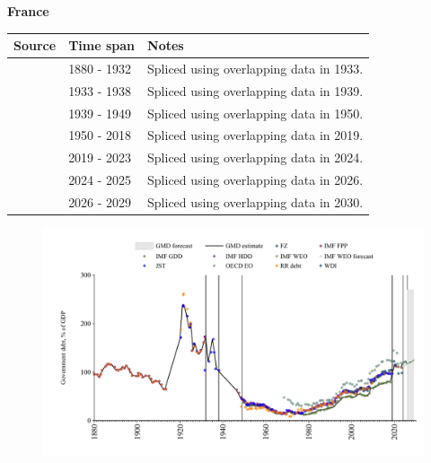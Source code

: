 \documentclass[12pt,a4paper,landscape]{article}
\begin{document}
\begin{adjustbox}{max totalsize={\paperwidth}{\paperheight},center}
\begin{minipage}[t][\textheight][t]{\textwidth}
\vspace*{0.5cm}
{}
\begin{center}
{\Large\bfseries France}
\end{center}
\vspace{0.5cm}
\begin{table}[H]
\centering
\small
\begin{tabular}{|l|l|l|}
\hline
\textbf{Source} & \textbf{Time span} & \textbf{Notes} \\
\hline
\rowcolor{white}\cite{IMF_FPP}& 1880 - 1932 &Spliced using overlapping data in 1933.\\
\rowcolor{lightgray}\cite{JST}& 1933 - 1938 &Spliced using overlapping data in 1939.\\
\rowcolor{white}\cite{IMF_FPP}& 1939 - 1949 &Spliced using overlapping data in 1950.\\
\rowcolor{lightgray}\cite{IMF_GDD}& 1950 - 2018 &Spliced using overlapping data in 2019.\\
\rowcolor{white}\cite{IMF_FPP}& 2019 - 2023 &Spliced using overlapping data in 2024.\\
\rowcolor{lightgray}\cite{OECD_EO}& 2024 - 2025 &Spliced using overlapping data in 2026.\\
\rowcolor{white}\cite{IMF_WEO_forecast}& 2026 - 2029 &Spliced using overlapping data in 2030.\\
\hline
\end{tabular}
\end{table}
\begin{figure}[H]
\centering
\includegraphics[width=\textwidth,height=0.6\textheight,keepaspectratio]{graphs/FRA_govdebt_GDP.pdf}
\end{figure}
\end{minipage}
\end{adjustbox}
\end{document}
